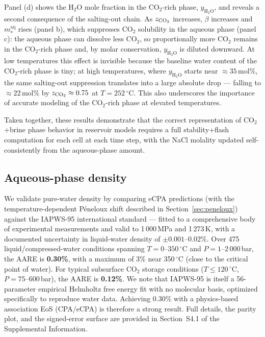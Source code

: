 \documentclass[preprint,12pt,number]{elsarticle}
\begin{document}
Panel (d) shows the H$_2$O mole fraction in the CO$_2$-rich phase, $y_{\mathrm{H_2O}}$,
and reveals a second consequence of the salting-out chain.
As $z_{\rm CO_2}$ increases, $\beta$ increases and $m_s^\mathrm{aq}$ rises (panel b), which suppresses
CO$_2$ solubility in the aqueous phase (panel c): the aqueous phase can dissolve less CO$_2$,
so proportionally more CO$_2$ remains in the CO$_2$-rich phase and, by molar conservation,
$y_{\mathrm{H_2O}}$ is diluted downward.
At low temperatures this effect is invisible because the baseline water content of
the CO$_2$-rich phase is tiny; at high temperatures, where $y_{\mathrm{H_2O}}$ starts near
$\approx 35$\,mol\%, the same salting-out suppression translates into a large absolute drop
--- falling to $\approx 22$\,mol\% by $z_{\rm CO_2} \approx 0.75$ at $T = 252\,^\circ$C.
This also underscores the importance of accurate modeling of the CO$_2$-rich phase
at elevated temperatures.

Taken together, these results demonstrate that the correct representation of
CO$_2$+brine phase behavior in reservoir models requires a full
stability+flash computation for each cell at each time step, with the
NaCl molality updated self-consistently from the aqueous-phase amount.



\subsection{Aqueous-phase density}
\label{sec:density}

We validate pure-water density by comparing eCPA predictions (with the
temperature-dependent Péneloux shift described in Section~\ref{sec:peneloux})
against the IAPWS-95 international standard \citep{IAPWS2016} — fitted to a
comprehensive body of experimental measurements and valid to 1\,000\,MPa and
1\,273\,K, with a documented uncertainty in liquid-water density of $\pm0.001$--$0.02\%$.
Over 475 liquid/compressed-water conditions spanning
$T = 0$--$350\,^\circ$C and $P = 1$--$2\,000$\,bar, the AARE is \textbf{0.30\%},
with a maximum of 3\% near 350\,$^\circ$C (close to the critical point of water).
For typical subsurface CO$_2$ storage conditions ($T \leq 120\,^\circ$C,
$P = 75$--$600$\,bar), the AARE is \textbf{0.12\%}.
We note that IAPWS-95 is itself a 56-parameter empirical Helmholtz free energy fit
with no molecular basis, optimized specifically to reproduce water data.
Achieving 0.30\% with a physics-based association EoS (CPA/eCPA) is therefore a strong result.
Full details, the parity plot, and the signed-error surface are provided in
Section~S4.1 of the Supplemental Information.
\end{document}
